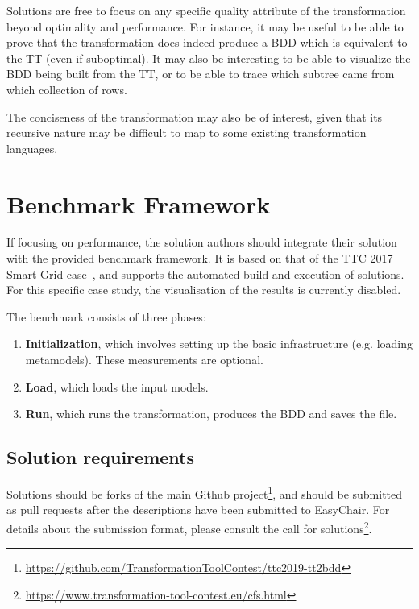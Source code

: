 \documentclass[a4paper]{scrartcl}
\begin{document}
Solutions are free to focus on any specific quality attribute of the
transformation beyond optimality and performance. For instance, it may be useful
to be able to prove that the transformation does indeed produce a BDD which is
equivalent to the TT (even if suboptimal). It may also be interesting to be able
to visualize the BDD being built from the TT, or to be able to trace which
subtree came from which collection of rows.

The conciseness of the transformation may also be of interest, given that its
recursive nature may be difficult to map to some existing transformation
languages.

\section{Benchmark Framework}
\label{sec:benchmark-framework}

If focusing on performance, the solution authors should integrate their solution
with the provided benchmark framework. It is based on that of the TTC 2017 Smart
Grid case~\cite{hinkel_ttc_2017}, and supports the automated build and execution
of solutions. For this specific case study, the visualisation of the results is
currently disabled.

The benchmark consists of three phases:

\begin{enumerate}
\item \textbf{Initialization}, which involves setting up the basic
  infrastructure (e.g. loading metamodels). These measurements are optional.
\item \textbf{Load}, which loads the input models.
\item \textbf{Run}, which runs the transformation, produces the BDD and saves
  the file.
\end{enumerate}

\subsection{Solution requirements}
\label{sec:solut-requ}

Solutions should be forks of the main Github
project\footnote{\url{https://github.com/TransformationToolContest/ttc2019-tt2bdd}},
and should be submitted as pull requests after the descriptions have been
submitted to EasyChair. For details about the submission format, please consult
the call for
solutions\footnote{\url{https://www.transformation-tool-contest.eu/cfs.html}}.
\end{document}
